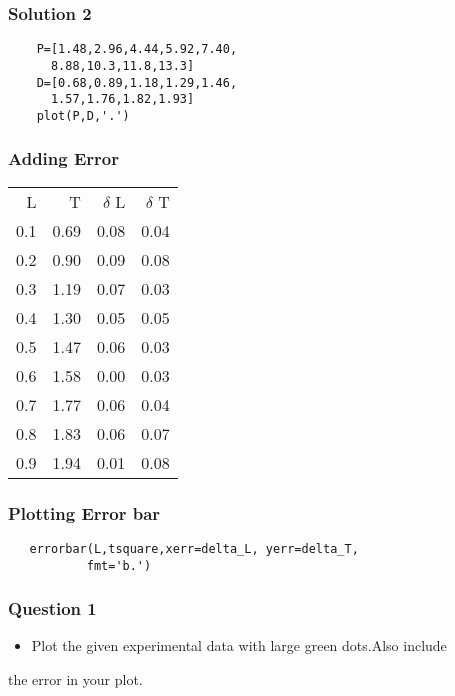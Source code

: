 \documentclass[presentation]{beamer}
\begin{document}
\begin{frame}[fragile]
\frametitle{Solution 2}
\label{sec-9}


\begin{verbatim}
    P=[1.48,2.96,4.44,5.92,7.40,
      8.88,10.3,11.8,13.3]
    D=[0.68,0.89,1.18,1.29,1.46,
      1.57,1.76,1.82,1.93]
    plot(P,D,'.')
\end{verbatim}
\end{frame}
\begin{frame}
\frametitle{Adding Error}
\label{sec-10}




\begin{center}
\begin{tabular}{rrrr}
   L  &     T  &  $\delta$ L  &  $\delta$ T  \\
 0.1  &  0.69  &        0.08  &        0.04  \\
 0.2  &  0.90  &        0.09  &        0.08  \\
 0.3  &  1.19  &        0.07  &        0.03  \\
 0.4  &  1.30  &        0.05  &        0.05  \\
 0.5  &  1.47  &        0.06  &        0.03  \\
 0.6  &  1.58  &        0.00  &        0.03  \\
 0.7  &  1.77  &        0.06  &        0.04  \\
 0.8  &  1.83  &        0.06  &        0.07  \\
 0.9  &  1.94  &        0.01  &        0.08  \\
\end{tabular}
\end{center}


 
 
\end{frame}
\begin{frame}[fragile]
\frametitle{Plotting Error bar}
\label{sec-11}

  
\begin{verbatim}
   errorbar(L,tsquare,xerr=delta_L, yerr=delta_T,
           fmt='b.')
\end{verbatim}
\end{frame}
\begin{frame}
\frametitle{Question 1}
\label{sec-12}


\begin{itemize}
\item Plot the given experimental data with large green dots.Also include
\end{itemize}

  the error in your plot. 

  
\end{frame}
\end{document}
